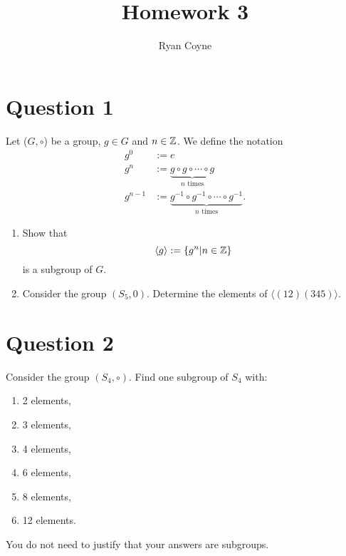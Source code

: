 \documentclass[12pt]{article}
\title{Homework 3}
\author{Ryan Coyne}
\begin{document}
    \maketitle

    \section*{Question 1}
    Let (\(G, \circ\)) be a group, \(g\in G\) and \(n\in \mathbb{Z}\). We define the notation
    \begin{equation*}
        \begin{split}
            g^0 &:= e\\
            g^n &:= \underbrace{g\circ g\circ\cdots\circ g}_{n\text{ times}}\\
            g^{n-1} &:= \underbrace{g^{-1}\circ g^{-1}\circ \cdots \circ g^{-1}}_{n\text{ times}}.
        \end{split}
    \end{equation*}
    \begin{enumerate}[label=\alph*)]
        \item Show that
        \begin{equation*}
            \langle g \rangle := \{g^n | n \in \mathbb{Z}\}
        \end{equation*}
        is a subgroup of \(G\).
        \item Consider the group \((S_5, 0)\). Determine the elements of \(\langle (12)(345) \rangle\).
    \end{enumerate}

    \section*{Question 2}
    Consider the group \((S_4, \circ )\). Find one subgroup of \(S_4\) with:
    \begin{enumerate}[label=\alph*)]
        \item 2 elements,
        \item 3 elements,
        \item 4 elements,
        \item 6 elements,
        \item 8 elements,
        \item 12 elements.
    \end{enumerate}
    You do not need to justify that your answers are subgroups.
\end{document}
